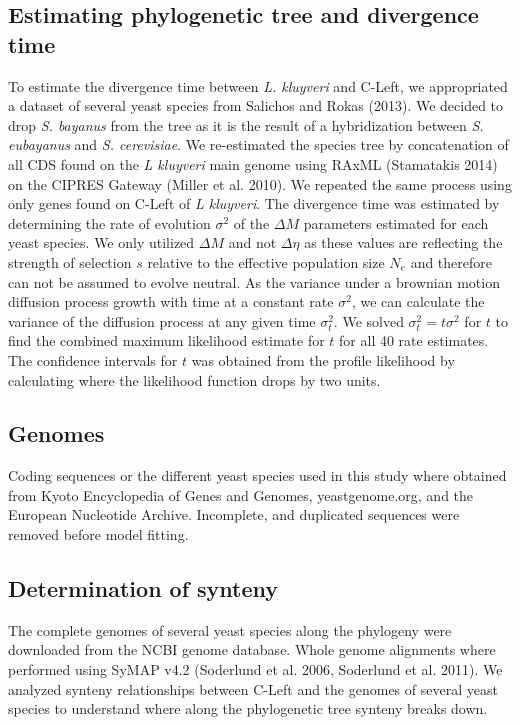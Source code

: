 \documentclass[12pt]{article}
\begin{document}
\subsection*{Estimating phylogenetic tree and divergence time}
To estimate the divergence time between \textit{L. kluyveri} and C-Left, we appropriated a dataset of several yeast species from Salichos and Rokas (2013). 
We decided to drop \textit{S. bayanus} from the tree as it is the result of a hybridization between \textit{S. eubayanus} and \textit{S. cerevisiae}.
We re-estimated the species tree by concatenation of all CDS found on the \textit{L kluyveri} main genome using RAxML (Stamatakis 2014) on the CIPRES Gateway (Miller et al. 2010).
We repeated the same process using only genes found on C-Left of \textit{L kluyveri}.
The divergence time was estimated by determining the rate of evolution $\sigma^2$ of the $\Delta M$ parameters estimated for each yeast species.
We only utilized $\Delta M$ and not $\Delta \eta$ as these values are reflecting the strength of selection $s$ relative to the effective population size $N_e$ and therefore can not be assumed to evolve neutral.
As the variance under a brownian motion diffusion process growth with time at a constant rate $\sigma^2$, we can calculate the variance of the diffusion process at any given time $\sigma^2_t$. 
We solved $\sigma^2_t = t\sigma^2$ for $t$ to find the combined maximum likelihood estimate for $t$ for all 40 rate estimates.
The confidence intervals for $t$ was obtained from the profile likelihood by calculating where the likelihood function drops by two units.
  
\subsection*{Genomes}
Coding sequences or the different yeast species used in this study where obtained from Kyoto Encyclopedia of Genes and Genomes, yeastgenome.org, and the European Nucleotide Archive. Incomplete, and duplicated sequences were removed before model fitting.

\subsection*{Determination of synteny}	
The complete genomes of several yeast species along the phylogeny were downloaded from the NCBI genome database.
Whole genome alignments where performed using SyMAP v4.2 (Soderlund et al. 2006, Soderlund et al. 2011).
We analyzed synteny relationships between C-Left and the genomes of several yeast species to understand where along the phylogenetic tree synteny breaks down.
  
\end{document}
